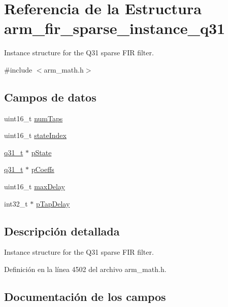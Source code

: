 \hypertarget{structarm__fir__sparse__instance__q31}{}\section{Referencia de la Estructura arm\+\_\+fir\+\_\+sparse\+\_\+instance\+\_\+q31}
\label{structarm__fir__sparse__instance__q31}


Instance structure for the Q31 sparse F\+IR filter.  




{\ttfamily \#include $<$arm\+\_\+math.\+h$>$}

\subsection*{Campos de datos}
\begin{DoxyCompactItemize}
\item 
uint16\+\_\+t \hyperlink{structarm__fir__sparse__instance__q31_a751941891e47f522a7f5375fe8990aac}{num\+Taps}
\item 
uint16\+\_\+t \hyperlink{structarm__fir__sparse__instance__q31_a566a0cb53437e48b9a3bf18e5b03d8aa}{state\+Index}
\item 
\hyperlink{arm__math_8h_adc89a3547f5324b7b3b95adec3806bc0}{q31\+\_\+t} $\ast$ \hyperlink{structarm__fir__sparse__instance__q31_adee4ba3ee8869865af7d8fa08ca913d6}{p\+State}
\item 
\hyperlink{arm__math_8h_adc89a3547f5324b7b3b95adec3806bc0}{q31\+\_\+t} $\ast$ \hyperlink{structarm__fir__sparse__instance__q31_a68888e36167d81cb7836db10367a1682}{p\+Coeffs}
\item 
uint16\+\_\+t \hyperlink{structarm__fir__sparse__instance__q31_ab25f4ee7550e6d92acff77ada283733f}{max\+Delay}
\item 
int32\+\_\+t $\ast$ \hyperlink{structarm__fir__sparse__instance__q31_adec00b3793ab4f08edfeb4ea6a9eb6e6}{p\+Tap\+Delay}
\end{DoxyCompactItemize}


\subsection{Descripción detallada}
Instance structure for the Q31 sparse F\+IR filter. 

Definición en la línea 4502 del archivo arm\+\_\+math.\+h.



\subsection{Documentación de los campos}
